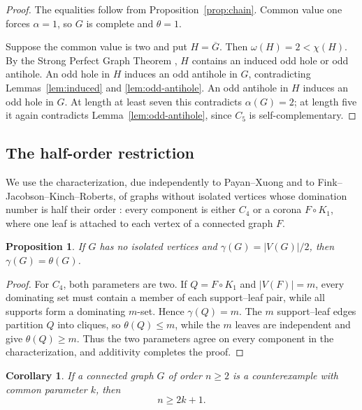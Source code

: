 \documentclass[11pt]{article}
\newtheorem{proposition}[theorem]{Proposition}
\newtheorem{corollary}[theorem]{Corollary}
\theoremstyle{definition}
\theoremstyle{remark}
\newcommand{\V}{V}
\begin{document}
\begin{proof}
The equalities follow from Proposition~\ref{prop:chain}.  Common value one
forces \(\alpha=1\), so \(G\) is complete and \(\theta=1\).

Suppose the common value is two and put \(H=\overline G\).  Then
\(\omega(H)=2<\chi(H)\).  By the Strong Perfect Graph Theorem
\cite{ChudnovskyRobertsonSeymourThomas2006}, \(H\) contains an induced odd
hole or odd antihole.  An odd hole in \(H\) induces an odd antihole in
\(G\), contradicting Lemmas~\ref{lem:induced} and
\ref{lem:odd-antihole}.  An odd antihole in \(H\) induces an odd hole in
\(G\).  At length at least seven this contradicts \(\alpha(G)=2\); at
length five it again contradicts Lemma~\ref{lem:odd-antihole}, since
\(C_5\) is self-complementary.
\end{proof}

\subsection{The half-order restriction}

We use the characterization, due independently to Payan--Xuong and to
Fink--Jacobson--Kinch--Roberts, of graphs without isolated vertices whose
domination number is half their order
\cite{PayanXuong1982,FinkJacobsonKinchRoberts1985}: every component is
either \(C_4\) or a corona \(F\circ K_1\), where one leaf is attached to
each vertex of a connected graph \(F\).

\begin{proposition}\label{prop:half-order}
If \(G\) has no isolated vertices and
\(\gamma(G)=|\V(G)|/2\), then \(\gamma(G)=\theta(G)\).
\end{proposition}

\begin{proof}
For \(C_4\), both parameters are two.  If \(Q=F\circ K_1\) and
\(|\V(F)|=m\), every dominating set must contain a member of each
support--leaf pair, while all supports form a dominating \(m\)-set.
Hence \(\gamma(Q)=m\).  The \(m\) support--leaf edges partition \(Q\) into
cliques, so \(\theta(Q)\leq m\), while the \(m\) leaves are independent and
give \(\theta(Q)\geq m\).  Thus the two parameters agree on every component
in the characterization, and additivity completes the proof.
\end{proof}

\begin{corollary}\label{cor:half-order}
If a connected graph \(G\) of order \(n\geq2\) is a counterexample with
common parameter \(k\), then
\[
  n\geq2k+1.
\tag{2.8}
\]
\end{corollary}
\end{document}

